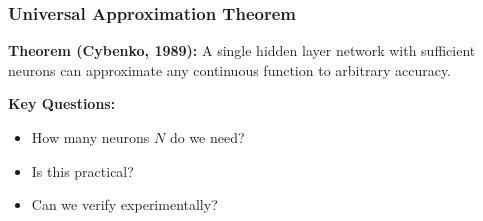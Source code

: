 \documentclass[notes]{beamer}
\begin{document}
\begin{frame}
\frametitle{Universal Approximation Theorem}

\textbf{Theorem (Cybenko, 1989):} A single hidden layer network with sufficient neurons can approximate any continuous function to arbitrary accuracy.


\textbf{Key Questions:}
\begin{itemize}
\item How many neurons $N$ do we need?
\item Is this practical?
\item Can we verify experimentally?
\end{itemize}

\end{frame}
\end{document}
